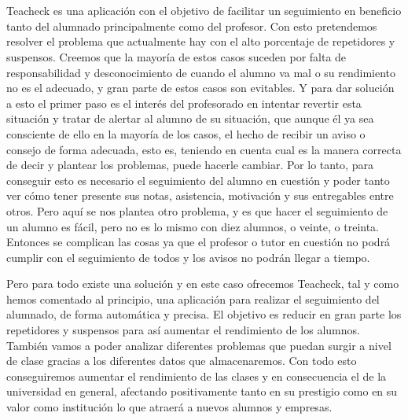 \section{\propuestaValor}

\paragraph{}
Teacheck es una aplicación con el objetivo de facilitar un seguimiento en beneficio tanto del alumnado principalmente como del profesor. Con esto pretendemos resolver el problema que actualmente hay con el alto porcentaje de repetidores y suspensos. Creemos que la mayoría de estos casos suceden por falta de responsabilidad y desconocimiento de cuando el alumno va mal o su rendimiento no es el adecuado, y gran parte de estos casos son evitables. Y para dar solución a esto el primer paso es el interés del profesorado en intentar revertir esta situación y tratar de alertar al alumno de su situación, que aunque él ya sea consciente de ello en la mayoría de los casos, el hecho de recibir un aviso o consejo de forma adecuada, esto es, teniendo en cuenta cual es la manera correcta de decir y plantear los problemas, puede hacerle cambiar. Por lo tanto, para conseguir esto es necesario el seguimiento del alumno en cuestión y poder tanto ver cómo tener presente sus notas, asistencia, motivación y sus entregables entre otros. Pero aquí se nos plantea otro problema, y es que hacer el seguimiento de un alumno es fácil, pero no es lo mismo con diez alumnos, o veinte, o treinta. Entonces se complican las cosas ya que el profesor o tutor en cuestión no podrá cumplir con el seguimiento de todos y los avisos no podrán llegar a tiempo. 

Pero para todo existe una solución y en este caso ofrecemos Teacheck, tal y como hemos comentado al principio, una aplicación para realizar el seguimiento del alumnado, de forma automática y precisa. El objetivo es reducir en gran parte los repetidores y suspensos para así aumentar el rendimiento de los alumnos. También vamos a poder analizar diferentes problemas que puedan surgir a nivel de clase gracias a los diferentes datos que almacenaremos. Con todo esto conseguiremos aumentar el rendimiento de las clases y en consecuencia el de la universidad en general, afectando positivamente tanto en su prestigio como en su valor como institución lo que atraerá a nuevos alumnos y empresas.

\section{\actividadesClave}

